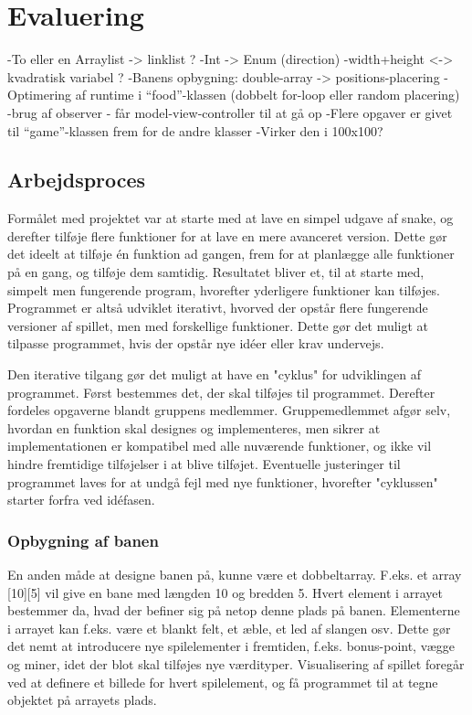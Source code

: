 \section{Evaluering}
-To eller en Arraylist -> linklist ?
-Int -> Enum (direction)
-width+height <-> kvadratisk variabel ?
-Banens opbygning: double-array -> positions-placering
-Optimering af runtime i “food”-klassen (dobbelt for-loop eller random placering)
-brug af observer - får model-view-controller til at gå op
-Flere opgaver er givet til “game”-klassen frem for de andre klasser
-Virker den i 100x100?
 
\subsection{Arbejdsproces}
Formålet med projektet var at starte med at lave en simpel udgave af snake, og derefter tilføje flere funktioner for at lave en mere avanceret version. Dette gør det ideelt at tilføje én funktion ad gangen, frem for at planlægge alle funktioner på en gang, og tilføje dem samtidig. Resultatet bliver et, til at starte med, simpelt men fungerende program, hvorefter yderligere funktioner kan tilføjes. Programmet er altså udviklet iterativt, hvorved der opstår flere fungerende versioner af spillet, men med forskellige funktioner. Dette gør det muligt at tilpasse programmet, hvis der opstår nye idéer eller krav undervejs. 
 
Den iterative tilgang gør det muligt at have en "cyklus" for udviklingen af programmet. Først bestemmes det, der skal tilføjes til programmet. Derefter fordeles opgaverne blandt gruppens medlemmer. Gruppemedlemmet afgør selv, hvordan en funktion skal designes og implementeres, men sikrer at implementationen er kompatibel med alle nuværende funktioner, og ikke vil hindre fremtidige tilføjelser i at blive tilføjet. Eventuelle justeringer til programmet laves for at undgå fejl med nye funktioner, hvorefter "cyklussen" starter forfra ved idéfasen.

\subsubsection{Opbygning af banen}
En anden måde at designe banen på, kunne være et dobbeltarray. F.eks. et array [10][5] vil give en bane med længden 10 og bredden 5. Hvert element i arrayet bestemmer da, hvad der befiner sig på netop denne plads på banen. Elementerne i arrayet kan f.eks. være et blankt felt, et æble, et led af slangen osv. Dette gør det nemt at introducere nye spilelementer i fremtiden, f.eks. bonus-point, vægge og miner, idet der blot skal tilføjes nye værdityper. Visualisering af spillet foregår ved at definere et billede for hvert spilelement, og få programmet til at tegne objektet på arrayets plads.

